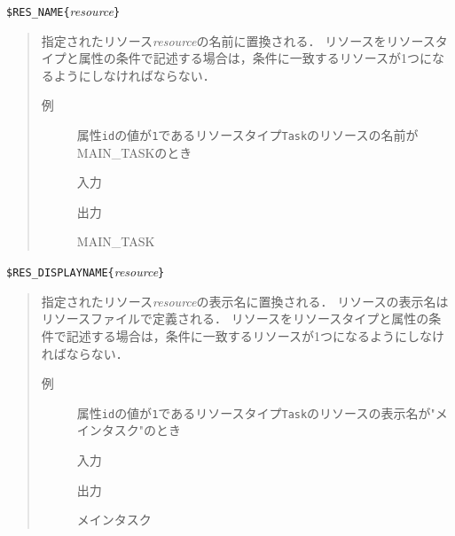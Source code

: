 \verb|$RES_NAME{|\textit{resource}\verb|}|
\vspace{-1zw}
\begin{quote}
指定されたリソース{\it resource}の名前に置換される．
リソースをリソースタイプと属性の条件で記述する場合は，条件に一致するリソースが1つになるようにしなければならない．

\begin{description}
\item[例] 属性{\tt id}の値が{\tt 1}であるリソースタイプ{\tt Task}のリソースの名前がMAIN\_TASKのとき

\hspace*{-1zw}入力\vspace{-1.75zw}
\hspace*{-1zw}出力\vspace{-1.75zw}
\begin{EBNF}
MAIN_TASK
\end{EBNF}
\end{description}

\end{quote}

\verb|$RES_DISPLAYNAME{|\textit{resource}\verb|}|
\vspace{-1zw}
\begin{quote}
指定されたリソース{\it resource}の表示名に置換される．
リソースの表示名はリソースファイルで定義される．
リソースをリソースタイプと属性の条件で記述する場合は，条件に一致するリソースが1つになるようにしなければならない．

\begin{description}
\item[例] 属性{\tt id}の値が{\tt 1}であるリソースタイプ{\tt Task}のリソースの表示名が"メインタスク"のとき

\hspace*{-1zw}入力\vspace{-1.75zw}
\hspace*{-1zw}出力\vspace{-1.75zw}
\begin{EBNF}
メインタスク
\end{EBNF}
\end{description}

\end{quote}

